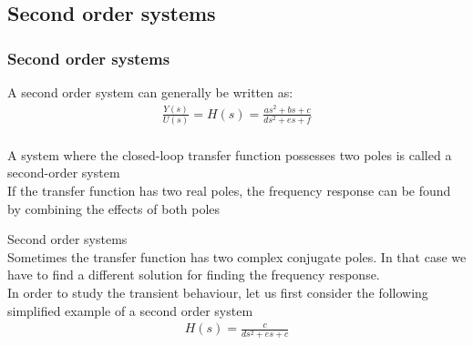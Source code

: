 \subsection{Second order systems} 

\begin{frame}
\frametitle{Second order systems}
A second order system can generally be written as:
\vspace{0.4cm}
\\ 
\begin{align*}
\frac{Y(s)}{U(s)}=H(s)=\frac{as^2+ bs+ c}{ds^2+ es+ f}
\end{align*}
\vspace{0.2cm}
\pause
\\ A system where the closed-loop transfer function possesses two poles is called a second-order system
\vspace{0.4cm}
\pause
\\ If the transfer function has two real poles, the frequency response can be found by combining the effects of both poles
\end{frame}

\begin{frame}{Second order systems} 
\vspace{-0.5cm}
\\ Sometimes the transfer function has two complex conjugate poles. In that case we have to find a different solution for finding the frequency response.
\pause
\vspace{1cm}
\\ In order to study the transient behaviour, let us first consider the following simplified example of a second order system
\\ 
\begin{align*}
H(s) = \frac{c}{ds^2+es+c}
\end {align*}
\vspace{-0.5cm}
\end{frame}

